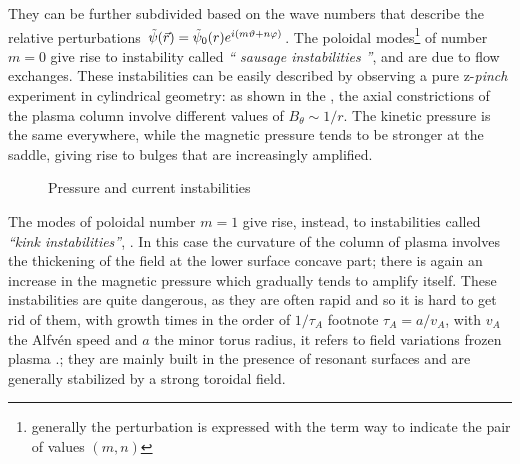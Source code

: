 They can be further subdivided based on the wave numbers that describe the relative perturbations $\tilde{\psi}(\Vec{r}) =
\Tilde{\psi}_0(r)e^{i(m\vartheta+n\varphi)}$.
%
The poloidal modes\footnote{generally the perturbation is expressed with the term way to indicate the pair of values $(m, n)$} of number $m = 0$ give rise to instability called \emph{`` sausage instabilities ''}, and are due to flow exchanges. These instabilities can be easily described by observing a pure z-\textit{pinch} experiment in cylindrical geometry: as shown in the \Figure{\ref{fig:press-curr1}}, the axial constrictions of the plasma column involve different values of $B_\theta \sim 1/r$. The kinetic pressure is the same everywhere, while the magnetic pressure tends to be stronger at the saddle, giving rise to bulges that are increasingly amplified.
%
\begin{figure}[ht]
 \centering
 \caption{Pressure and current instabilities}
\end{figure}
%
The modes of poloidal number $m = 1$ give rise, instead, to instabilities called \emph{``kink instabilities''}, \Figure{\ref{fig:press-curr2}}. In this case the curvature of the column of plasma involves the thickening of the field at the lower surface concave part; there is again an increase in the magnetic pressure which gradually tends to amplify itself.
%
These instabilities are quite dangerous, as they are often rapid and so it is hard to get rid of them, with growth times in the order of $1/\tau_A$ footnote {$\tau_A = a/v_A$, with $ v_A $ the Alfvén speed and $a$ the minor torus radius, it refers to field variations frozen plasma \cite{fridberg}.}; they are mainly built in the presence of resonant surfaces and are generally stabilized by a strong toroidal field.

